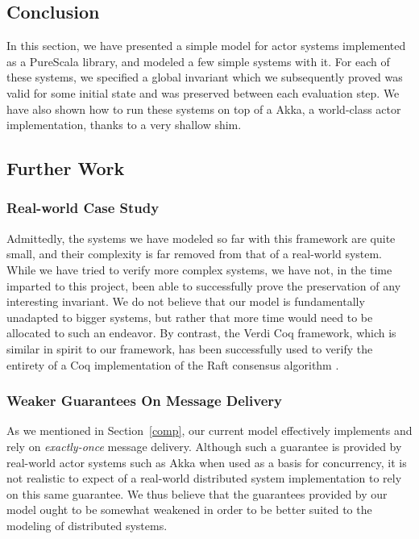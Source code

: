 \documentclass[a4paper,twoside]{article}
\newcommand{\RefSec}[1]{Section~\ref{#1}}
\begin{document}
\subsection{Conclusion}

In this section, we have presented a simple model for actor systems implemented as a PureScala library, and modeled a few simple systems with it. For each of these systems, we specified a global invariant which we subsequently proved was valid for some initial state and was preserved between each evaluation step. We have also shown how to run these systems on top of a Akka, a world-class actor implementation, thanks to a very shallow shim.

\subsection{Further Work}

\subsubsection*{Real-world Case Study}

Admittedly, the systems we have modeled so far with this framework are quite small, and their complexity is far removed from that of a real-world system. While we have tried to verify more complex systems, we have not, in the time imparted to this project, been able to successfully prove the preservation of any interesting invariant. We do not believe that our model is fundamentally unadapted to bigger systems, but rather that more time would need to be allocated to such an endeavor. By contrast, the Verdi Coq framework, which is similar in spirit to our framework, has been successfully used to verify the entirety of a Coq implementation of the Raft consensus algorithm \cite{verdi}.

\subsubsection*{Weaker Guarantees On Message Delivery}

As we mentioned in \RefSec{comp}, our current model effectively implements and rely on \textit{exactly-once} message delivery. Although such a guarantee is provided by real-world actor systems such as Akka when used as a basis for concurrency, it is not realistic to expect of a real-world distributed system implementation to rely on this same guarantee. We thus believe that the guarantees provided by our model ought to be somewhat weakened in order to be better suited to the modeling of distributed systems.
\end{document}

